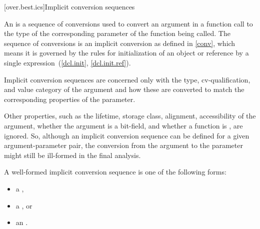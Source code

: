 [over.best.ics]{Implicit conversion sequences}%

\pnum
An 
is a sequence of conversions used
to convert an argument in a function call to the type of the
corresponding parameter of the function being called.
The
sequence of conversions is an implicit conversion as defined in
\ref{conv}, which means it is governed by the rules for
initialization of an object or reference by a single
expression~(\ref{dcl.init}, \ref{dcl.init.ref}).

\pnum
Implicit conversion sequences are concerned only with the type,
cv-qualification, and value category of the argument and how these
are converted to match the corresponding properties of the
parameter.
\begin{note}
Other properties, such as the lifetime, storage class,
alignment, accessibility of the argument, whether the argument is a bit-field,
and whether a function is , are ignored.
So, although an implicit
conversion sequence can be defined for a given argument-parameter
pair, the conversion from the argument to the parameter might still
be ill-formed in the final analysis.
\end{note}

\pnum
A
well-formed implicit conversion
sequence is one of the following forms:
\begin{itemize}
\item
a ,
\item
a , or
\item
an .
\end{itemize}

